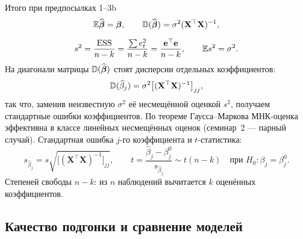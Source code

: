 Итого при предпосылках 1--3b
\begin{equation}
  \begin{gathered}
    \mathbb{E}\widehat{\boldsymbol{\beta}} = \boldsymbol{\beta},
    \qquad
    \mathbb{D}(\widehat{\boldsymbol{\beta}}) = \sigma^2(\mathbf{X}^{\top}\mathbf{X})^{-1},
    \\[6pt]
    s^2 = \frac{\mathrm{ESS}}{n-k}
        = \frac{\sum e_t^2}{n-k}
        = \frac{\mathbf{e}^{\top}\mathbf{e}}{n-k},
    \qquad
    \mathbb{E} s^2 = \sigma^2 .
  \end{gathered}
  \label{eq:props}
\end{equation}
На диагонали матрицы $\mathbb{D}(\widehat{\boldsymbol{\beta}})$ стоят дисперсии отдельных
коэффициентов:
\[
  \mathbb{D}(\widehat{\beta}_j)
  = \sigma^2\bigl[(\mathbf{X}^{\top}\mathbf{X})^{-1}\bigr]_{jj} ,
\]
так что, заменив неизвестную $\sigma^2$ её несмещённой оценкой $s^2$, получаем
стандартные ошибки коэффициентов.
По теореме Гаусса--Маркова МНК-оценка эффективна в классе линейных несмещённых
оценок (семинар~2 — парный случай). Стандартная ошибка $j$-го коэффициента и
$t$-статистика:
\begin{equation}
  s_{\widehat{\beta}_j} = s\sqrt{\bigl[(\mathbf{X}^{\top}\mathbf{X})^{-1}\bigr]_{jj}},
  \qquad
  t = \frac{\widehat{\beta}_j - \beta_j^0}{s_{\widehat{\beta}_j}} \sim t(n-k)
  \quad\text{при } H_0\colon \beta_j = \beta_j^0 .
  \label{eq:t}
\end{equation}
Степеней свободы $n-k$: из $n$ наблюдений вычитается $k$ оценённых коэффициентов.

\subsection{Качество подгонки и сравнение моделей}\label{sec:fit}

